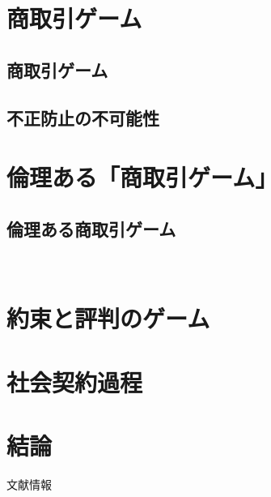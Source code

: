 \documentclass[uplatex]{jsbook}
\begin{document}
\chapter{商取引ゲーム}
	\section{商取引ゲーム}

	\section{不正防止の不可能性}

\chapter{倫理ある「商取引ゲーム」}
	\section{倫理ある商取引ゲーム}
  　
\chapter{約束と評判のゲーム}

\chapter{社会契約過程}

\chapter{結論}

\renewcommand{\refname}{参考文献}
\begin{thebibliography}{数字}
   文献情報
\end{thebibliography}
\end{document}
